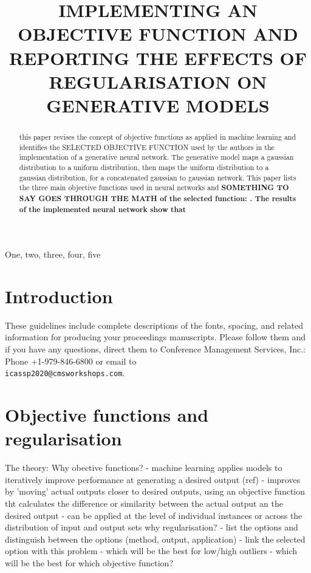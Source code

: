 \documentclass{article}
\title{IMPLEMENTING AN OBJECTIVE FUNCTION AND REPORTING THE EFFECTS OF REGULARISATION ON GENERATIVE MODELS}
\begin{document}
%
\maketitle
%
\begin{abstract}
this paper revises the concept of objective functions as applied in machine learning and identifies the SELECTED OBJECTIVE FUNCTION used by the authors in the implementation of a generative neural network.  The generative model maps a gaussian distribution to a uniform distribution, then maps the uniform distribution to a gaussian distribution, for a concatenated gaussian to gaussian network.  This paper lists the three main objective functions used in neural networks and \bf{SOMETHING TO SAY GOES THROUGH THE MATH of the selected function:  .}  The results of the implemented neural network show that 
\end{abstract}
%
\begin{keywords}
One, two, three, four, five
\end{keywords}
%
\section{Introduction}
\label{sec:intro}
%
These guidelines include complete descriptions of the fonts, spacing, and
related information for producing your proceedings manuscripts. Please follow
them and if you have any questions, direct them to Conference Management
Services, Inc.: Phone +1-979-846-6800 or email
to \\\texttt{icassp2020@cmsworkshops.com}.

\section{Objective functions and regularisation}
\label{sec:format}

The theory:  
Why obective functions?
- machine learning applies models to iteratively improve performance at generating a desired output (ref)
- improves by 'moving' actual outputs closer to desired outputs, using an objective function tht calculates the difference or similarity between the actual output an the desired output
- can be applied at the level of individual instances or across the distribution of input and output sets
why regularisation?
- list the options and distinguish between the options (method, output, application)
- link the selected option with this problem 
  - which will be the best for low/high outliers
  - which will be the best for 
which objective function?
\end{document}
